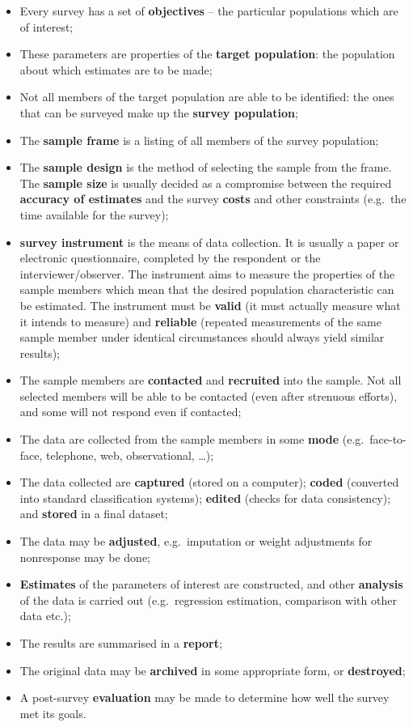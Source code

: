 \documentclass[
]{book}
\providecommand{\tightlist}{%
  \setlength{\itemsep}{0pt}\setlength{\parskip}{0pt}}
\begin{document}
\begin{itemize}
\tightlist
\item
  Every survey has a set of \textbf{objectives} -- the particular populations
  which are of interest;
\item
  These parameters are properties of the \textbf{target population}: the
  population about which estimates are to be made;
\item
  Not all members of the target population are able to be identified: the
  ones that can be surveyed make up the \textbf{survey population};
\item
  The \textbf{sample frame} is a listing of all members of the survey
  population;
\item
  The \textbf{sample design} is the method of selecting the sample from the
  frame. The \textbf{sample size} is usually decided as a compromise between the
  required \textbf{accuracy of estimates} and the survey \textbf{costs} and other
  constraints (e.g.~the time available for the survey);
\item
  \textbf{survey instrument} is the means of data collection. It is
  usually a paper or electronic questionnaire, completed by the respondent or
  the interviewer/observer. The instrument aims to measure the properties of
  the sample members which mean that the desired population characteristic can
  be estimated. The instrument must be \textbf{valid} (it must actually measure
  what it intends to measure) and \textbf{reliable} (repeated measurements of the
  same sample member under identical circumstances should always yield similar
  results);
\item
  The sample members are \textbf{contacted} and \textbf{recruited} into the
  sample. Not all selected members will be able to be contacted (even after
  strenuous efforts), and some will not respond even if contacted;
\item
  The data are collected from the sample members in some \textbf{mode}
  (e.g.~face-to-face, telephone, web, observational, \ldots);
\item
  The data collected are \textbf{captured} (stored on a computer); \textbf{coded}
  (converted into standard classification systems); \textbf{edited} (checks for
  data consistency); and \textbf{stored} in a final dataset;
\item
  The data may be \textbf{adjusted}, e.g.~imputation or weight adjustments
  for nonresponse may be done;
\item
  \textbf{Estimates} of the parameters of interest are constructed, and other
  \textbf{analysis} of the data is carried out (e.g.~regression estimation,
  comparison with other data etc.);
\item
  The results are summarised in a \textbf{report};
\item
  The original data may be \textbf{archived} in some appropriate form,
  or \textbf{destroyed};
\item
  A post-survey \textbf{evaluation} may be made to determine how well the survey
  met its goals.
\end{itemize}
\end{document}
